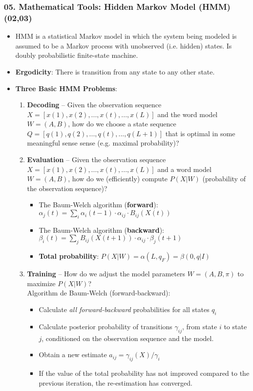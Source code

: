 \documentclass[a4paper]{article}
\begin{document}
    \subsubsection*{05. Mathematical Tools: Hidden Markov Model (HMM) (02,03)}
      \begin{itemize}
        \item HMM is a statistical Markov model in which the system being modeled is assumed to be a Markov process with unobserved (i.e. hidden) states. Is doubly probabilistic finite-state machine.
        \item \textbf{Ergodicity}: There is transition from any state to any other state.
        \item \textbf{Three Basic HMM Problems}:
        \begin{enumerate}
          \item \textbf{Decoding} -- Given the observation sequence $X=[x(1),x(2),...,x(t),...,x(L)]$ and the word model $W=(A,B)$, how do we choose a state sequence $Q=[q(1),q(2),...,q(t),...,q(L+1)]$ that is optimal in some meaningful sense sense (e.g. maximal probability)?
          \item \textbf{Evaluation} -- Given the observation sequence $X=[x(1),x(2),...,x(t),...,x(L)]$ and a word model $W=(A,B)$, how do we (efficiently) compute $P(X|W)$ (probability of the observation sequence)?
          \begin{itemize}
            \item The Baum-Welch algorithm (\textbf{forward}): $\alpha_j(t)=\sum_i{\alpha_i(t-1)\cdot\alpha_{ij}\cdot B_{ij}(X(t))}$
            \item The Baum-Welch algorithm (\textbf{backward}): $\beta_i(t)=\sum_j{B_{ij}(X(t+1))\cdot\alpha_{ij}\cdot\beta_{j}(t+1)}$
            \item \textbf{Total probability}: $P(X|W)=\alpha(L, q_F)=\beta(0,q|I)$
          \end{itemize}
          \item \textbf{Training} -- How do we adjust the model parameters $W=(A,B,\pi)$ to maximize $P(X|W)$?\\
          Algorithm de Baum-Welch (forward-backward):
          \begin{itemize}
            \item Calculate \emph{all forward-backward} probabilities for all states $q_i$
            \item Calculate posterior probability of transitions $\gamma_{ij}$, from state $i$ to state $j$, conditioned on the observation sequence and the model.
            \item Obtain a new estimate $a_{ij}=\gamma_{ij}(X)/\gamma_i$
            \item If the value of the total probability has not improved compared to the previous iteration, the re-estimation has converged.
          \end{itemize}
        \end{enumerate}


\end{itemize}
\end{document}
